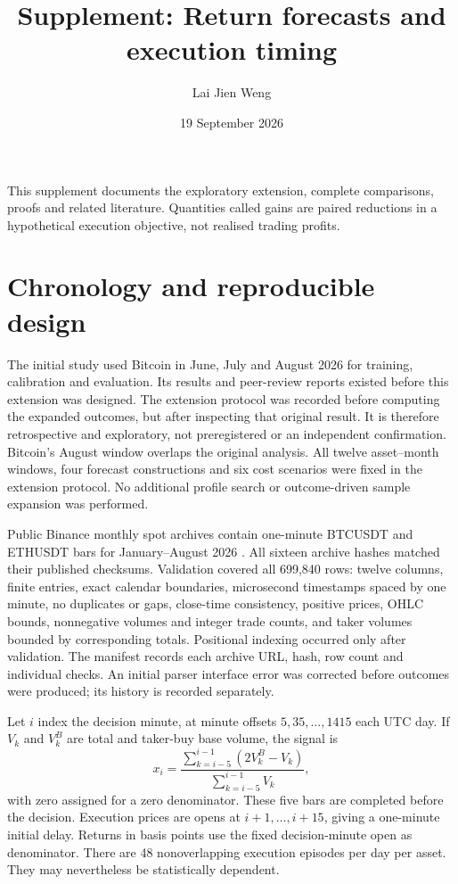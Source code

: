 \documentclass[11pt]{article}
\title{Supplement: Return forecasts and execution timing}
\author{Lai Jien Weng}
\date{19 September 2026}
\begin{document}
\maketitle
\noindent This supplement documents the exploratory extension, complete comparisons, proofs and related literature. Quantities called gains are paired reductions in a hypothetical execution objective, not realised trading profits.
\section{Chronology and reproducible design}
The initial study used Bitcoin in June, July and August 2026 for training, calibration and evaluation. Its results and peer-review reports existed before this extension was designed. The extension protocol was recorded before computing the expanded outcomes, but after inspecting that original result. It is therefore retrospective and exploratory, not preregistered or an independent confirmation. Bitcoin's August window overlaps the original analysis. All twelve asset--month windows, four forecast constructions and six cost scenarios were fixed in the extension protocol. No additional profile search or outcome-driven sample expansion was performed.

Public Binance monthly spot archives contain one-minute BTCUSDT and ETHUSDT bars for January--August 2026 \citep{binance2026}. All sixteen archive hashes matched their published checksums. Validation covered all 699,840 rows: twelve columns, finite entries, exact calendar boundaries, microsecond timestamps spaced by one minute, no duplicates or gaps, close-time consistency, positive prices, OHLC bounds, nonnegative volumes and integer trade counts, and taker volumes bounded by corresponding totals. Positional indexing occurred only after validation. The manifest records each archive URL, hash, row count and individual checks. An initial parser interface error was corrected before outcomes were produced; its history is recorded separately.

Let $i$ index the decision minute, at minute offsets $5,35,\ldots,1415$ each UTC day. If $V_k$ and $V_k^B$ are total and taker-buy base volume, the signal is
\[
 x_i=\frac{\sum_{k=i-5}^{i-1}(2V_k^B-V_k)}{\sum_{k=i-5}^{i-1}V_k},
\]
with zero assigned for a zero denominator. These five bars are completed before the decision. Execution prices are opens at $i+1,\ldots,i+15$, giving a one-minute initial delay. Returns in basis points use the fixed decision-minute open as denominator. There are 48 nonoverlapping execution episodes per day per asset. They may nevertheless be statistically dependent.
\end{document}
